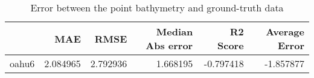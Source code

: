 \begin{table}[h!]
\caption{Error between the point bathymetry and ground-truth data}
\label{tab:oahu6_lidar_error}
\begin{tabular}{lrrrrr}
\toprule
 & MAE & RMSE & Median Abs error & R2 Score & Average Error \\
\midrule
oahu6 & 2.084965 & 2.792936 & 1.668195 & -0.797418 & -1.857877 \\
\bottomrule
\end{tabular}
\end{table}
